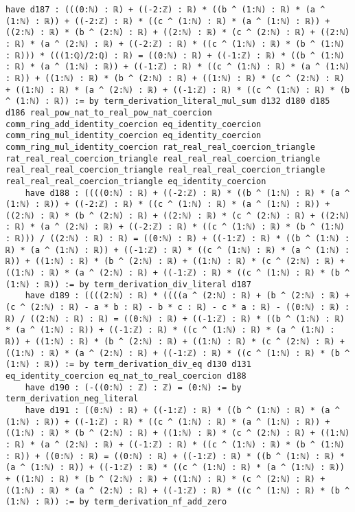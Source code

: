 \documentclass{article}
\begin{document}
\begin{tcolorbox}[colback=white!10, width=\linewidth]
\begin{lstlisting}[language=Lean4]
    have d187 : (((0:ℕ) : ℝ) + ((-2:ℤ) : ℝ) * ((b ^ (1:ℕ) : ℝ) * (a ^ (1:ℕ) : ℝ)) + ((-2:ℤ) : ℝ) * ((c ^ (1:ℕ) : ℝ) * (a ^ (1:ℕ) : ℝ)) + ((2:ℕ) : ℝ) * (b ^ (2:ℕ) : ℝ) + ((2:ℕ) : ℝ) * (c ^ (2:ℕ) : ℝ) + ((2:ℕ) : ℝ) * (a ^ (2:ℕ) : ℝ) + ((-2:ℤ) : ℝ) * ((c ^ (1:ℕ) : ℝ) * (b ^ (1:ℕ) : ℝ))) * (((1:ℚ)/2:ℚ) : ℝ) = ((0:ℕ) : ℝ) + ((-1:ℤ) : ℝ) * ((b ^ (1:ℕ) : ℝ) * (a ^ (1:ℕ) : ℝ)) + ((-1:ℤ) : ℝ) * ((c ^ (1:ℕ) : ℝ) * (a ^ (1:ℕ) : ℝ)) + ((1:ℕ) : ℝ) * (b ^ (2:ℕ) : ℝ) + ((1:ℕ) : ℝ) * (c ^ (2:ℕ) : ℝ) + ((1:ℕ) : ℝ) * (a ^ (2:ℕ) : ℝ) + ((-1:ℤ) : ℝ) * ((c ^ (1:ℕ) : ℝ) * (b ^ (1:ℕ) : ℝ)) := by term_derivation_literal_mul_sum d132 d180 d185 d186 real_pow_nat_to_real_pow_nat_coercion comm_ring_add_identity_coercion eq_identity_coercion comm_ring_mul_identity_coercion eq_identity_coercion comm_ring_mul_identity_coercion rat_real_real_coercion_triangle rat_real_real_coercion_triangle real_real_real_coercion_triangle real_real_real_coercion_triangle real_real_real_coercion_triangle real_real_real_coercion_triangle eq_identity_coercion
    have d188 : ((((0:ℕ) : ℝ) + ((-2:ℤ) : ℝ) * ((b ^ (1:ℕ) : ℝ) * (a ^ (1:ℕ) : ℝ)) + ((-2:ℤ) : ℝ) * ((c ^ (1:ℕ) : ℝ) * (a ^ (1:ℕ) : ℝ)) + ((2:ℕ) : ℝ) * (b ^ (2:ℕ) : ℝ) + ((2:ℕ) : ℝ) * (c ^ (2:ℕ) : ℝ) + ((2:ℕ) : ℝ) * (a ^ (2:ℕ) : ℝ) + ((-2:ℤ) : ℝ) * ((c ^ (1:ℕ) : ℝ) * (b ^ (1:ℕ) : ℝ))) / ((2:ℕ) : ℝ) : ℝ) = ((0:ℕ) : ℝ) + ((-1:ℤ) : ℝ) * ((b ^ (1:ℕ) : ℝ) * (a ^ (1:ℕ) : ℝ)) + ((-1:ℤ) : ℝ) * ((c ^ (1:ℕ) : ℝ) * (a ^ (1:ℕ) : ℝ)) + ((1:ℕ) : ℝ) * (b ^ (2:ℕ) : ℝ) + ((1:ℕ) : ℝ) * (c ^ (2:ℕ) : ℝ) + ((1:ℕ) : ℝ) * (a ^ (2:ℕ) : ℝ) + ((-1:ℤ) : ℝ) * ((c ^ (1:ℕ) : ℝ) * (b ^ (1:ℕ) : ℝ)) := by term_derivation_div_literal d187
    have d189 : ((((2:ℕ) : ℝ) * ((((a ^ (2:ℕ) : ℝ) + (b ^ (2:ℕ) : ℝ) + (c ^ (2:ℕ) : ℝ) - a * b : ℝ) - b * c : ℝ) - c * a : ℝ) - ((0:ℕ) : ℝ) : ℝ) / ((2:ℕ) : ℝ) : ℝ) = ((0:ℕ) : ℝ) + ((-1:ℤ) : ℝ) * ((b ^ (1:ℕ) : ℝ) * (a ^ (1:ℕ) : ℝ)) + ((-1:ℤ) : ℝ) * ((c ^ (1:ℕ) : ℝ) * (a ^ (1:ℕ) : ℝ)) + ((1:ℕ) : ℝ) * (b ^ (2:ℕ) : ℝ) + ((1:ℕ) : ℝ) * (c ^ (2:ℕ) : ℝ) + ((1:ℕ) : ℝ) * (a ^ (2:ℕ) : ℝ) + ((-1:ℤ) : ℝ) * ((c ^ (1:ℕ) : ℝ) * (b ^ (1:ℕ) : ℝ)) := by term_derivation_div_eq d130 d131 eq_identity_coercion eq_nat_to_real_coercion d188
    have d190 : (-((0:ℕ) : ℤ) : ℤ) = (0:ℕ) := by term_derivation_neg_literal
    have d191 : ((0:ℕ) : ℝ) + ((-1:ℤ) : ℝ) * ((b ^ (1:ℕ) : ℝ) * (a ^ (1:ℕ) : ℝ)) + ((-1:ℤ) : ℝ) * ((c ^ (1:ℕ) : ℝ) * (a ^ (1:ℕ) : ℝ)) + ((1:ℕ) : ℝ) * (b ^ (2:ℕ) : ℝ) + ((1:ℕ) : ℝ) * (c ^ (2:ℕ) : ℝ) + ((1:ℕ) : ℝ) * (a ^ (2:ℕ) : ℝ) + ((-1:ℤ) : ℝ) * ((c ^ (1:ℕ) : ℝ) * (b ^ (1:ℕ) : ℝ)) + ((0:ℕ) : ℝ) = ((0:ℕ) : ℝ) + ((-1:ℤ) : ℝ) * ((b ^ (1:ℕ) : ℝ) * (a ^ (1:ℕ) : ℝ)) + ((-1:ℤ) : ℝ) * ((c ^ (1:ℕ) : ℝ) * (a ^ (1:ℕ) : ℝ)) + ((1:ℕ) : ℝ) * (b ^ (2:ℕ) : ℝ) + ((1:ℕ) : ℝ) * (c ^ (2:ℕ) : ℝ) + ((1:ℕ) : ℝ) * (a ^ (2:ℕ) : ℝ) + ((-1:ℤ) : ℝ) * ((c ^ (1:ℕ) : ℝ) * (b ^ (1:ℕ) : ℝ)) := by term_derivation_nf_add_zero

\end{lstlisting}
\end{tcolorbox}
\end{document}
